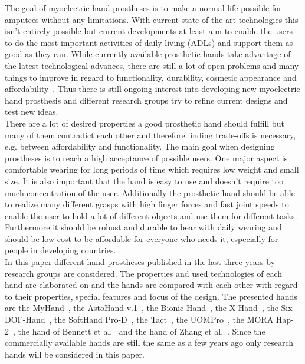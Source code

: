 \documentclass[a4paper, 10pt, conference]{ieeeconf}      %
\begin{document}
The goal of myoelectric hand prostheses is to make a normal life possible for amputees without any limitations. With current state-of-the-art technologies this isn't entirely possible but current developments at least aim to enable the users to do the most important activities of daily living (ADLs) and support them as good as they can. While currently available prosthetic hands take advantage of the latest technological advances, there are still a lot of open problems and many things to improve in regard to functionality, durability, cosmetic appearance and affordability~\cite{review}. Thus there is still ongoing interest into developing new myoelectric hand prosthesis and different research groups try to refine current designs and test new ideas.\\
There are a lot of desired properties a good prosthetic hand should fulfill but many of them contradict each other and therefore finding trade-offs is necessary, e.g. between affordability and functionality. The main goal when designing prostheses is to reach a high acceptance of possible users. One major aspect is comfortable wearing for long periods of time which requires low weight and small size. It is also important that the hand is easy to use and doesn't require too much concentration of the user. Additionally the prosthetic hand should be able to realize many different grasps with high finger forces and fast joint speeds to enable the user to hold a lot of different objects and use them for different tasks. Furthermore it should be robust and durable to bear with daily wearing and should be low-cost to be affordable for everyone who needs it, especially for people in developing countries.\\
In this paper different hand prostheses published in the last three years by research groups are considered. The properties and used technologies of each hand are elaborated on and the hands are compared with each other with regard to their properties, special features and focus of the design. The presented hands are the MyHand~\cite{myhand}, the AstoHand v.1~\cite{astohand}, the Bionic Hand~\cite{bionichand}, the X-Hand~\cite{xhand}, the Six-DOF-Hand~\cite{6dofhand}, the SoftHand Pro-D~\cite{softhand}, the Tact~\cite{tact}, the UOMPro~\cite{uompro}, the MORA Hap-2~\cite{morahap2}, the hand of Bennett et al.~\cite{bennett} and the hand of Zhang et al.~\cite{zhang}. Since the commercially available hands are still the same as a few years ago only research hands will be considered in this paper.
 
\end{document}
